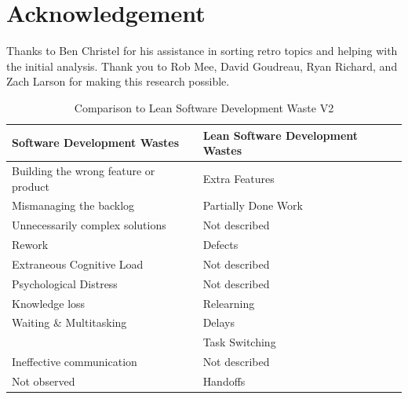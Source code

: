 \section*{Acknowledgement}
Thanks to Ben Christel for his assistance in sorting retro topics and helping with the initial analysis. Thank you to Rob Mee, David Goudreau, Ryan Richard, and Zach Larson for making this research possible.




\begin{table}[t]
\renewcommand{\arraystretch}{1.5}
\centering
\caption{Comparison to Lean Software Development Waste V2}
\label{LeanSoftwareDevelopmentComparisonTable2}
\begin{tabular}{|p{1.57in}|p{1.57in}|}
\hline
Software Development Wastes           & Lean Software Development Wastes \\ \hline
Building the wrong feature or product & Extra Features                            \\ \hline
Mismanaging the backlog               & Partially Done Work                            \\ \hline
Unnecessarily complex solutions                & Not described                             \\ \hline
Rework                                & Defects                                   \\ \hline
Extraneous Cognitive Load                 & Not described  \\ \hline
Psychological Distress                             & Not described \\ \hline
Knowledge loss                 & Relearning                            \\ \hline
Waiting \& Multitasking                              & Delays                                    \\  
                  & Task Switching  \\ \hline
Ineffective communication             & Not described                             \\ \hline
Not observed                          & Handoffs                                  \\ \hline
\end{tabular}
\end{table}
